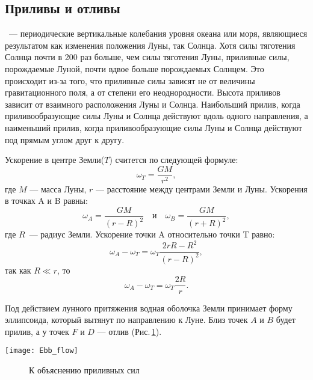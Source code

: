 \subsection{Приливы и отливы}

~--- периодические вертикальные колебания уровня океана или моря, являющиеся результатом как изменения положения Луны, так Солнца. Хотя силы тяготения Солнца почти в 200 раз больше, чем силы тяготения Луны, приливные силы, порождаемые Луной, почти вдвое больше порождаемых Солнцем. Это происходит из-за того, что приливные силы зависят не от величины гравитационного поля, а от степени его неоднородности. Высота приливов зависит от взаимного расположения Луны и Солнца. Наибольший прилив, когда приливообразующие силы Луны и Солнца действуют вдоль одного направления, а наименьший прилив, когда приливообразующие силы Луны и Солнца действуют под прямым углом друг к другу.

Ускорение в центре Земли($T$) считется по следующей формуле: \begin{equation}\omega_T=\frac{GM}{r^2},
\end{equation}
где $M$ --- масса Луны, $r$ --- расстояние между центрами Земли и Луны. Ускорения в точках A и B равны: \begin{equation}
\omega_A = \frac{GM}{(r - R)^2} \quad \text{и} \quad \omega_B = \frac{GM}{(r + R)^2},
\end{equation}
где $R$~--- радиус Земли. Ускорение точки A относительно точки T равно:\begin{equation}
\omega_A - \omega_T = \omega_T \frac{2 r R - R^2}{(r - R)^2},
\end{equation}
так как $R\ll r$, то \begin{equation}
\omega_A - \omega_T = \omega_T \frac{2 R}{r}.
\end{equation}

Под действием лунного притяжения водная оболочка Земли принимает форму 
эллипсоида, который вытянут по направлению к Луне. Близ точек $A$ и $B$ будет 
прилив, а у точек $F$ и $D$ --- отлив (Рис.\,\ref{Ebb_flow}).
\begin{center}
\texttt{[image: Ebb\_flow]}
\begin{figure}[h!]
\caption{К объяснению приливных сил}\label{Ebb_flow}
\end{figure}
\end{center}
